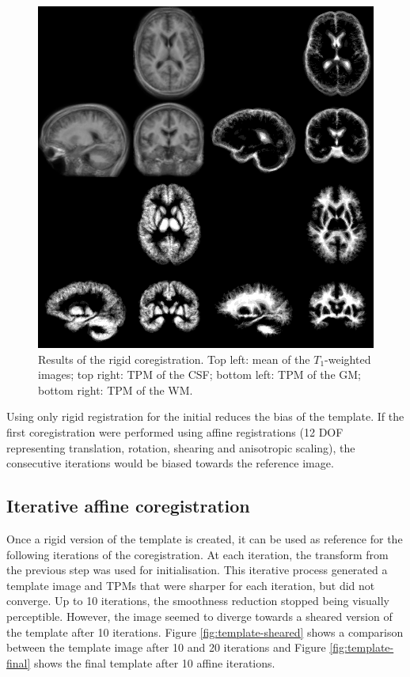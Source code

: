 \begin{figure}
  \centering
  \includegraphics[width=\textwidth]{figures/rigid_template_collage}
  \caption{Results of the rigid coregistration. Top left: mean of the $T_1$-weighted images; top right: TPM of the CSF; bottom left: TPM of the GM; bottom right: TPM of the WM.}
  \label{fig:template-rigid}
\end{figure}

Using only rigid registration for the initial reduces the bias of the template. If the first coregistration were performed using affine registrations (12 DOF representing translation, rotation, shearing and anisotropic scaling), the consecutive iterations would be biased towards the reference image.


\subsection{Iterative affine coregistration}
Once a rigid version of the template is created, it can be used as reference for the following iterations of the coregistration. At each iteration, the transform from the previous step was used for initialisation. This iterative process generated a template image and TPMs that were sharper for each iteration, but did not converge. Up to 10 iterations, the smoothness reduction stopped being visually perceptible. However, the image seemed to diverge towards a sheared version of the template after 10 iterations. Figure \ref{fig:template-sheared} shows a comparison between the template image after 10 and 20 iterations and Figure \ref{fig:template-final} shows the final template after 10 affine iterations.


